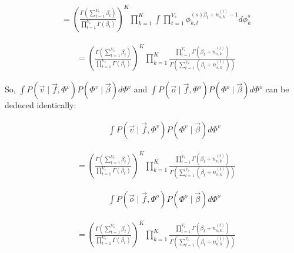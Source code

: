 \documentclass{article}
\begin{document}
\begin{equation}
\begin{aligned}
&= \left( \frac{\varGamma(\sum_{t=1}^{V_s} \beta_t)}{\prod_{t=1}^{V_s}\varGamma(\beta_t)} \right)^K 
\prod_{k=1}^{K}\int \prod_{t=1}^{V_s}\phi_{k,t}^{(s)\beta_t + n_{s,k}^{(t)} -1} d\phi_k^s
\end{aligned}
\end{equation}

\begin{equation}
\begin{aligned}
&= \left( \frac{\varGamma(\sum_{t=1}^{V_s} \beta_t)}{\prod_{t=1}^{V_s}\varGamma(\beta_t)} \right)^K 
\prod_{k=1}^{K}
\frac{\prod_{t=1}^{V_s}\varGamma(\beta_t+n_{s,k}^{(t)})}{\varGamma(\sum_{t=1}^{V_s} (\beta_t+n_{s,k}^{(t)}))} 
\end{aligned}
\end{equation}


So, $\int P(\vec{v} \mid \vec{f}, \Phi^v) P(\Phi^v \mid \vec{\beta}) d\Phi^v$ and $\int P(\vec{o} \mid \vec{f}, \Phi^o) P(\Phi^o \mid \vec{\beta}) d\Phi^o$ can be deduced identically:

\begin{equation}
\begin{aligned}
&\qquad \int P(\vec{v} \mid \vec{f}, \Phi^v) P(\Phi^v \mid \vec{\beta}) d\Phi^v
\end{aligned}
\end{equation}


\begin{equation}
\begin{aligned}
&= \left( \frac{\varGamma(\sum_{t=1}^{V_v} \beta_t)}{\prod_{t=1}^{V_v}\varGamma(\beta_t)} \right)^K 
\prod_{k=1}^{K}
\frac{\prod_{t=1}^{V_v}\varGamma(\beta_t+n_{v,k}^{(t)})}{\varGamma(\sum_{t=1}^{V_v} (\beta_t+n_{v,k}^{(t)}))} 
\end{aligned}
\end{equation}

\begin{equation}
\begin{aligned}
&\qquad \int P(\vec{o} \mid \vec{f}, \Phi^o) P(\Phi^o \mid \vec{\beta}) d\Phi^o
\end{aligned}
\end{equation}


\begin{equation}
\begin{aligned}
&= \left( \frac{\varGamma(\sum_{t=1}^{V_o} \beta_t)}{\prod_{t=1}^{V_o}\varGamma(\beta_t)} \right)^K 
\prod_{k=1}^{K}
\frac{\prod_{t=1}^{V_o}\varGamma(\beta_t+n_{o,k}^{(t)})}{\varGamma(\sum_{t=1}^{V_o}(\beta_t+n_{o,k}^{(t)}))} 
\end{aligned}
\end{equation}
\end{document}
